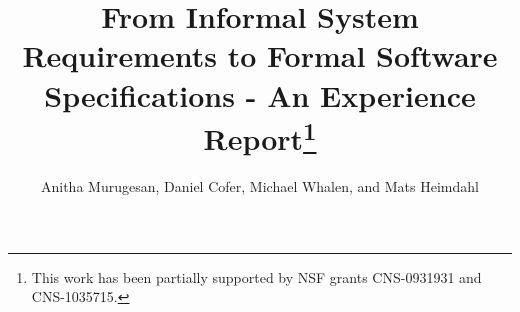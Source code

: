 \documentclass{llncs}
\begin{document}
\sloppypar


\title{From Informal System Requirements to Formal Software Specifications  - An Experience Report\thanks{This work has been partially supported by NSF grants CNS-0931931 and CNS-1035715.}}

\author{Anitha Murugesan, Daniel Cofer, Michael Whalen, and Mats Heimdahl}

\maketitle

\begin{abstract}

\end{abstract}








%






\end{document}
